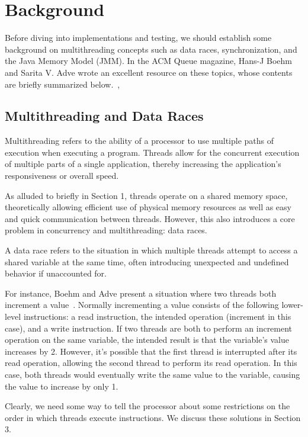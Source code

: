 \section{Background}
Before diving into implementations and testing, we should establish some
background on multithreading concepts such as 
data races, synchronization, and the Java Memory Model (JMM). In the ACM Queue
magazine, Hans-J Boehm and Sarita V. Adve wrote an excellent resource on these topics, 
whose contents are briefly summarized below.~\cite{arpachiDusseau18:osbook},

\subsection{Multithreading and Data Races}
Multithreading refers to the ability of a processor to use multiple paths of execution
when executing a program. Threads allow for the concurrent execution of multiple parts of a single 
application, thereby increasing the application's responsiveness or overall speed.

As alluded to briefly in Section 1, threads operate on a shared memory space, 
theoretically allowing efficient use of physical memory resources as well as 
easy and quick communication between threads. However, this also introduces a core
problem in concurrency and multithreading: data races. 

A data race refers to the situation in which multiple threads attempt to access a 
shared variable at the same time, often introducing unexpected and undefined behavior if unaccounted for.

For instance, Boehm and Adve present a situation where
two threads both increment a value~\cite{arpachiDusseau18:osbook}. Normally
incrementing a value consists of the following lower-level instructions:
a read instruction, the intended operation (increment in this case), and a write instruction. 
If two threads are both to perform an increment operation on the same variable,
the intended result is that the variable's value increases by 2. However, it's possible that 
the first thread is interrupted after its read operation, allowing the second thread
to perform its read operation. In this case, both threads would eventually 
write the same value to the variable, causing the value to increase by only 1.

Clearly, we need some way to tell the processor about some restrictions on the order
in which threads execute instructions. We discuss these solutions in Section 3.


